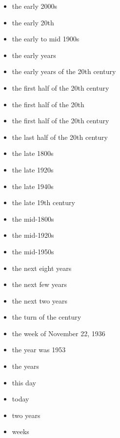 \documentclass[12pt,a4paper]{article}
\begin{document}
\begin{itemize}
  \item the early 2000s
  \item the early 20th
  \item the early to mid 1900s
  \item the early years
  \item the early years of the 20th century
  \item the first half of the 20th century
  \item the first half of the 20th
  \item the first half of the 20th century
  \item the last half of the 20th century
  \item the late 1800s
  \item the late 1920s
  \item the late 1940s
  \item the late 19th century
  \item the mid-1800s
  \item the mid-1920s
  \item the mid-1950s
  \item the next eight years
  \item the next few years
  \item the next two years
  \item the turn of the century
  \item the week of November 22, 1936
  \item the year was 1953
  \item the years
  \item this day
  \item today
  \item two years
  \item weeks
\end{itemize}
\end{document}
